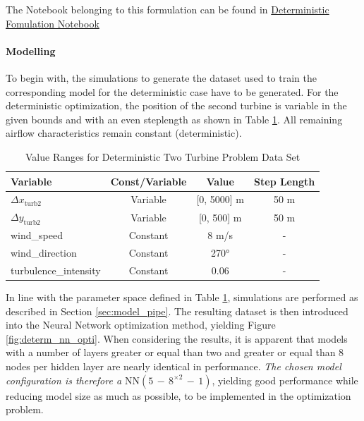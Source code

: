 \documentclass[preprint,12pt]{elsarticle}
\begin{document}
The Notebook belonging to this formulation can be found in \href{https://github.com/schmeti/uc3m_TFM_wind_farm_optimization_codebase/blob/main/Windfarm_power_modelling/0_two_turbine_problem_constrLearn_determin.ipynb}{Deterministic Fomulation Notebook} \cite{schmetz2025twoturbine_determ}

\paragraph{Modelling}

To begin with, the simulations to generate the dataset used to train the corresponding model for the deterministic case have to be generated. For the deterministic optimization, the position of the second turbine is variable in the given bounds and with an even steplength  as shown in Table \ref{tab:val_determ_data}. All remaining airflow characteristics remain constant (deterministic).

\begin{table}[ht]
	\centering
	\caption{Value Ranges for Deterministic Two Turbine Problem Data Set}
	\begin{tabular}{|l|c|c|c|}
		\hline
		\textbf{Variable} & \textbf{Const/Variable} & \textbf{Value} & Step Length\\
		\hline
		$\Delta x_{\text{turb2}}$ & Variable & [0, 5000] m & 50 m\\
		$\Delta y_{\text{turb2}}$ & Variable & [0, 500] m & 50 m \\
		wind\_speed & Constant & 8 m/s & -\\
		wind\_direction & Constant & 270°&- \\
		turbulence\_intensity & Constant & 0.06 & - \\
		\hline
	\end{tabular}
	
	\label{tab:val_determ_data}
\end{table}

In line with the parameter space defined in Table \ref{tab:val_determ_data}, simulations are performed as described in Section \ref{sec:model_pipe}. The resulting dataset is then introduced into the Neural Network optimization method, yielding Figure \ref{fig:determ_nn_opti}. When considering the results, it is apparent that models with a number of layers greater or equal than two and greater or equal than 8 nodes per hidden layer are nearly identical in performance. \textit{The chosen model configuration is therefore a $\text{NN}(5\,{-}\,8^{\times2}\,{-}\,1)$}, yielding good performance while reducing model size as much as possible, to be implemented in the optimization problem. 
\end{document}
